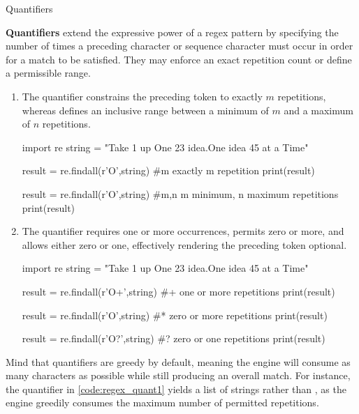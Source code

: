 \documentclass[10pt]{article}
\begin{document}
  \begin{core}[label=core:quantifier]{Quantifiers}

    \textbf{Quantifiers} extend the expressive power of a regex pattern by specifying the number of times a preceding character or sequence character must occur in order for a match to be satisfied. They may enforce an exact repetition count or define a permissible range.

    \begin{enumerate}

      \item The  quantifier constrains the preceding token to exactly $m$ repetitions, whereas  defines an inclusive range between a minimum of $m$ and a maximum of $n$ repetitions.

      \begin{pyconsole}

        import re
        string = "Take 1 up One 23 idea.One idea 45 at a Time"

        result = re.findall(r'O',string) #{m} exactly m repetition
        print(result)

        result = re.findall(r'O',string) #{m,n} m minimum, n maximum repetitions
        print(result)

      \end{pyconsole}

      \item The \textcode{+} quantifier requires one or more occurrences, \textcode{*} permits zero or more, and  allows either zero or one, effectively rendering the preceding token optional.

      \begin{pyconsole}

        import re
        string = "Take 1 up One 23 idea.One idea 45 at a Time"

        result = re.findall(r'O\w+',string) #+ one or more repetitions
        print(result)

        result = re.findall(r'O\w*',string) #* zero or more repetitions
        print(result)

        result = re.findall(r'O\w?',string) #? zero or one repetitions
        print(result)

      \end{pyconsole}

    \end{enumerate}

    Mind that quantifiers are greedy by default, meaning the engine will consume as many characters as possible while still producing an overall match. For instance, the  quantifier in \autoref{code:regex_quant1} yields a list of  strings rather than , as the engine greedily consumes the maximum number of permitted repetitions.

  \end{core}
\end{document}
